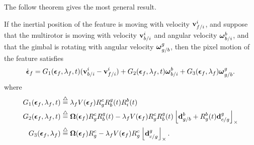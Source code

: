 The follow theorem gives the most general result.
\begin{theorem}
	If the inertial position of the feature is moving with velocity $\mathbf{v}_{f/i}^i$, and suppose that the multirotor is moving with velocity $\mathbf{v}_{b/i}^i$ and angular velocity $\boldsymbol{\omega}_{b/i}^b$, and that the gimbal is rotating with angular velocity $\boldsymbol{\omega}_{g/b}^g$, then the pixel motion of the feature satisfies
	\begin{equation} \label{eq:optic_flow_full}
	\dot{\epsilonbf}_f =G_1(\epsilonbf_f, \lambda_f, t) (\vbf_{b/i}^i-\vbf_{f/i}^i)
	+ G_2(\epsilonbf_f, \lambda_f, t) \omegabf_{b/i}^b
	+ G_3(\epsilonbf_f, \lambda_f) \omegabf_{g/b}^g.
	\end{equation}
	where
	\begin{align*}
	G_1(\boldsymbol{\epsilon}_f, \lambda_f, t) & \stackrel{\triangle}{=} 	\lambda_f V(\boldsymbol{\epsilon}_f) R_g^c R_b^g(t) R_i^b(t) \\
	G_2(\boldsymbol{\epsilon}_f, \lambda_f, t) & \stackrel{\triangle}{=}  \boldsymbol{\Omega}(\boldsymbol{\epsilon}_f)R_g^c R_b^g(t) - \lambda_f V(\boldsymbol{\epsilon}_f) R_g^c R_b^g(t) \left\lfloor\mathbf{d}_{g/b}^b+R_g^b(t) \mathbf{d}_{c/g}^g\right\rfloor_{\times} \\
	G_3(\boldsymbol{\epsilon}_f, \lambda_f) & \stackrel{\triangle}{=} 	\boldsymbol{\Omega}(\boldsymbol{\epsilon}_f) R_g^c - \lambda_f V(\boldsymbol{\epsilon}_f) R_g^c \left\lfloor\mathbf{d}_{c/g}^g\right\rfloor_{\times}.
	\end{align*}
\end{theorem}
